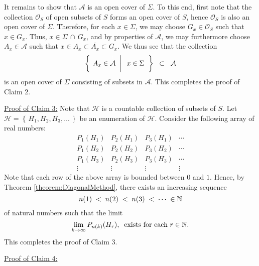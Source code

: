 \vskip 0.3cm
\noindent
It remains to show that $\mathcal{A}$ is an open cover of $\Sigma$.
To this end, first note that the collection $\mathcal{O}_{S}$ of open subsets of $S$
forms an open cover of $S$, hence $\mathcal{O}_{S}$ is also an open cover of $\Sigma$.
Therefore, for each $x \in \Sigma$, we may choose $G_{x} \in \mathcal{O}_{S}$
such that $x \in G_{x}$.
Thus, $x \in \Sigma\,\cap\,G_{x}$, and by properties of $\mathcal{A}$,
we may furthermore choose $A_{x} \in \mathcal{A}$ such that
$x \in A_{x} \subset \overline{A_{x}} \subset G_{x}$.
We thus see that the collection
\begin{equation*}
\left\{\;
\left.
A_{x} \in \overset{{\color{white}1}}{\mathcal{A}}
\;\;\right\vert\;\;
x \in \Sigma
\;\;\right\}
\;\; \subset \;\; \mathcal{A}
\end{equation*}
is an open cover of $\Sigma$ consisting of subsets in $\mathcal{A}$.
This completes the proof of Claim 2.

\vskip 0.5cm
\noindent
\underline{Proof of Claim 3:}\quad
Note that $\mathcal{H}$ is a countable collection of subsets of $S$.
Let $\mathcal{H} = \left\{\,H_{1}, H_{2}, H_{3}, \ldots \,\right\}$ be an enumeration of $\mathcal{H}$.
Consider the following array of real numbers:
\begin{equation*}
\begin{array}{cccc}
P_{1}(H_{1}) & P_{2}(H_{1}) & P_{3}(H_{1}) & \cdots \\
P_{1}(H_{2}) & P_{2}(H_{2}) & P_{3}(H_{2}) & \cdots \\
P_{1}(H_{3}) & P_{2}(H_{3}) & P_{3}(H_{3}) & \cdots \\
\vdots & \vdots & \vdots & \vdots  
\end{array}
\end{equation*}
Note that each row of the above array is bounded between $0$ and $1$.
Hence, by Theorem \ref{theorem:DiagonalMethod}, there exists an increasing sequence
\begin{equation*}
n(1) \;<\;
n(2) \;<\;
n(3) \;<\;
\cdots\; \in \mathbb{N}
\end{equation*}
of natural numbers such that the limit
\begin{equation*}
\lim_{k\rightarrow\infty} P_{n(k)}(H_{r}),
\;\;\textnormal{exists for each $r \in \mathbb{N}$}.
\end{equation*}
This completes the proof of Claim 3.

\vskip 0.5cm
\noindent
\underline{Proof of Claim 4:}\quad

